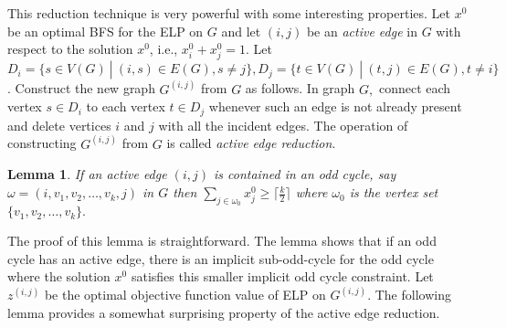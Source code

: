 \documentclass[12pt]{article}
\newtheorem{lemma}{Lemma}
\begin{document}
\vskip 10pt

 This reduction technique is
very powerful with some interesting properties. Let $x^0$ be an
optimal BFS for the ELP on $G$ and let $(i,j)$ be an \emph{active
edge} in $G$ with respect to the solution $x^0$, i.e.,
$x^0_i+x^0_j=1$.  Let $D_i=\{s\in V(G)\ |\ (i,s)\in E(G), s\not=j\},
D_j=\{t\in V(G)\ |\ (t,j)\in E(G), t\not=i\}$. Construct the new
graph $G^{(i,j)}$ from $G$ as follows. In graph $G,$ connect each
vertex $s\in D_i$ to each vertex $t\in D_j$ whenever such an edge is
not already present and delete vertices $i$ and $j$ with all the
incident edges. The operation of constructing $G^{(i,j)}$ from $G$
is called \emph{active edge reduction}.

\begin{lemma}\label{ll1} If an active edge $(i,j)$ is contained in
an odd cycle, say $\omega=(i,v_1,v_2,\ldots ,v_k,j)$ in $G$ then
$\sum_{j\in \omega_0}x_j^0\geq \lceil \frac{k}{2}\rceil$ where
$\omega_0$ is the vertex set $\{v_1,v_2,\ldots ,v_k\}.$\end{lemma}

The proof of this lemma is straightforward. The lemma shows that if
an odd cycle has an active edge, there is an implicit sub-odd-cycle
for the odd cycle where the solution $x^0$ satisfies this smaller
implicit odd cycle constraint. Let $z^{(i,j)}$ be the optimal
objective function value of ELP on $G^{(i,j)}$. The following lemma
provides a somewhat surprising property of the active edge
reduction.
\end{document}
